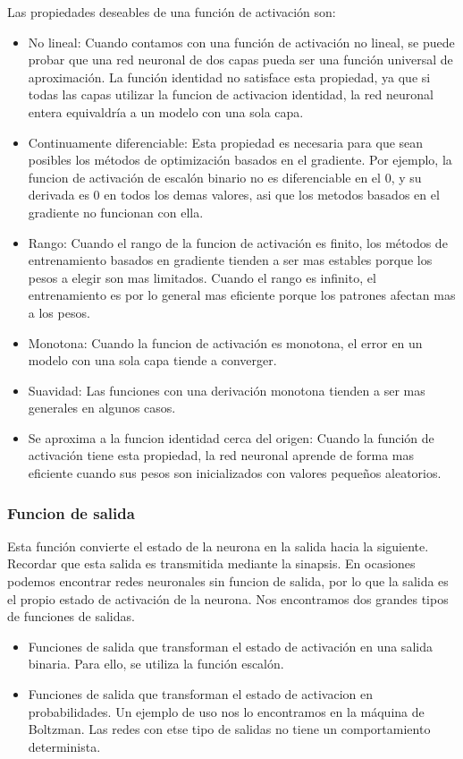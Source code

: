 Las propiedades deseables de una función de activación son:
\begin{itemize}
\item No lineal: Cuando contamos con una función de activación no lineal, se puede probar que una red neuronal de dos capas pueda ser una función universal de aproximación. La función identidad no satisface esta propiedad, ya que si todas las capas utilizar la funcion de activacion identidad, la red neuronal entera equivaldría a un modelo con una sola capa.
\item Continuamente diferenciable: Esta propiedad es necesaria para que sean posibles los métodos de optimización basados en el gradiente. Por ejemplo, la funcion de activación de escalón binario no es diferenciable en el 0, y su derivada es 0 en todos los demas valores, asi que los metodos basados en el gradiente no funcionan con ella.
\item Rango: Cuando el rango de la funcion de activación es finito, los métodos de entrenamiento basados en gradiente tienden a ser mas estables porque los pesos a elegir son mas limitados. Cuando el rango es infinito, el entrenamiento es por lo general mas eficiente porque los patrones afectan mas a los pesos.
\item Monotona: Cuando la funcion de activación es monotona, el error en un modelo con una sola capa tiende a converger.
\item Suavidad: Las funciones con una derivación monotona tienden a ser mas generales en algunos casos.
\item Se aproxima a la funcion identidad cerca del origen: Cuando la función de activación tiene esta propiedad, la red neuronal aprende de forma mas eficiente cuando sus pesos son inicializados con valores pequeños aleatorios.
\end{itemize}

\subsubsection {Funcion de salida}
Esta función convierte el estado de la neurona en la salida hacia la siguiente. Recordar que esta salida es transmitida mediante la sinapsis. En ocasiones podemos encontrar redes neuronales sin funcion de salida, por lo que la salida es el propio estado de activación de la neurona. Nos encontramos dos grandes tipos de funciones de salidas.
\begin{itemize}
\item Funciones de salida que transforman el estado de activación en una salida binaria. Para ello, se utiliza la función escalón.
\item Funciones de salida que transforman el estado de activacion en probabilidades. Un ejemplo de uso nos lo encontramos en la máquina de Boltzman. Las redes con etse tipo de salidas no tiene un comportamiento determinista.
\end{itemize}


